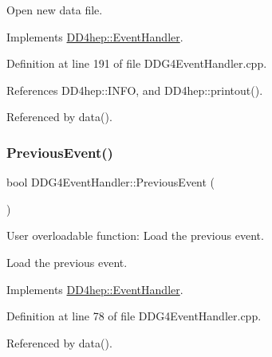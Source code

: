Open new data file. 



Implements \hyperlink{class_d_d4hep_1_1_event_handler_a90995d3b610beee9d9f7fafcc060626b}{D\+D4hep\+::\+Event\+Handler}.



Definition at line 191 of file D\+D\+G4\+Event\+Handler.\+cpp.



References D\+D4hep\+::\+I\+N\+FO, and D\+D4hep\+::printout().



Referenced by data().

\hypertarget{class_d_d4hep_1_1_d_d_g4_event_handler_a20cafa8eac655886d4a3d69338e7e947}{}\label{class_d_d4hep_1_1_d_d_g4_event_handler_a20cafa8eac655886d4a3d69338e7e947} 
\subsubsection{\texorpdfstring{Previous\+Event()}{PreviousEvent()}}
{\footnotesize\ttfamily bool D\+D\+G4\+Event\+Handler\+::\+Previous\+Event (\begin{DoxyParamCaption}{ }\end{DoxyParamCaption})\hspace{0.3cm}{\ttfamily [virtual]}}



User overloadable function\+: Load the previous event. 

Load the previous event. 

Implements \hyperlink{class_d_d4hep_1_1_event_handler_a0942608bebbdd107c9dedbdc7311791f}{D\+D4hep\+::\+Event\+Handler}.



Definition at line 78 of file D\+D\+G4\+Event\+Handler.\+cpp.



Referenced by data().

\hypertarget{class_d_d4hep_1_1_d_d_g4_event_handler_ad89bd74bf6a00c80055a0332a66ddee5}{}\label{class_d_d4hep_1_1_d_d_g4_event_handler_ad89bd74bf6a00c80055a0332a66ddee5} 
